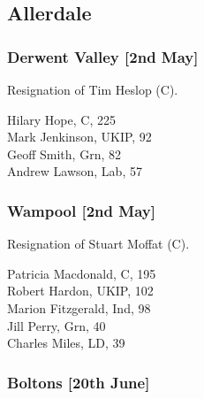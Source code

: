 \documentclass[a4paper,openany,10pt]{book}
\begin{document}
\subsection*{Allerdale}

\subsubsection*{Derwent Valley \hspace*{\fill}\nolinebreak[1]%
\enspace\hspace*{\fill}
[2nd May]}


Resignation of Tim Heslop (C).



Hilary Hope, C, 225\\
Mark Jenkinson, UKIP, 92\\
Geoff Smith, Grn, 82\\
Andrew Lawson, Lab, 57\\


\subsubsection*{Wampool \hspace*{\fill}\nolinebreak[1]%
\enspace\hspace*{\fill}
[2nd May]}


Resignation of Stuart Moffat (C).



Patricia Macdonald, C, 195\\
Robert Hardon, UKIP, 102\\
Marion Fitzgerald, Ind, 98\\
Jill Perry, Grn, 40\\
Charles Miles, LD, 39\\


\subsubsection*{Boltons \hspace*{\fill}\nolinebreak[1]%
\enspace\hspace*{\fill}
[20th June]}

\end{document}

